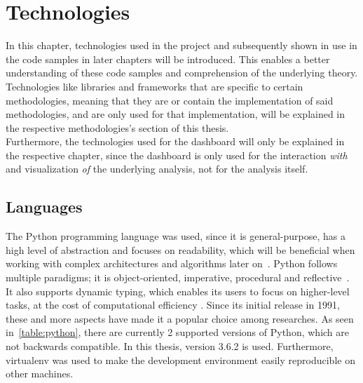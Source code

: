 
\chapter{Technologies}
\label{ch:technologiesUsed}

In this chapter, technologies used in the project and subsequently shown in use in the code samples in later chapters will be introduced.
This enables a better understanding of these code samples and comprehension of the underlying theory.\\
Technologies like libraries and frameworks that are specific to certain methodologies,
meaning that they are or contain the implementation of said methodologies,
and are only used for that implementation,
will be explained in the respective methodologies's section of this thesis.\\
Furthermore, the technologies used for the dashboard will only be explained in the respective chapter,
since the dashboard is only used for the interaction \textit{with} and visualization \textit{of} the underlying analysis,
not for the analysis itself.

\section{Languages}
\label{sec:languages}

The Python programming language was used, since it is general-purpose,
has a high level of abstraction and focuses on readability,
which will be beneficial when working with complex architectures and algorithms later on~\cite{pythonDocs}.
Python follows multiple paradigms;
it is object-oriented, imperative, procedural and reflective~\cite{van2007python}.
It also supports dynamic typing, which enables its users to focus on higher-level tasks, at the cost of computational efficiency \cite{Perez-schofield2010}.
Since its initial release in 1991, these and more aspects have made it a popular choice among researches.
As seen in~\cref{table:python}, there are currently 2 supported versions of Python, which are not backwards compatible.
In this thesis, version 3.6.2 is used.
Furthermore, virtualenv was used to make the development environment easily reproducible on other machines.

